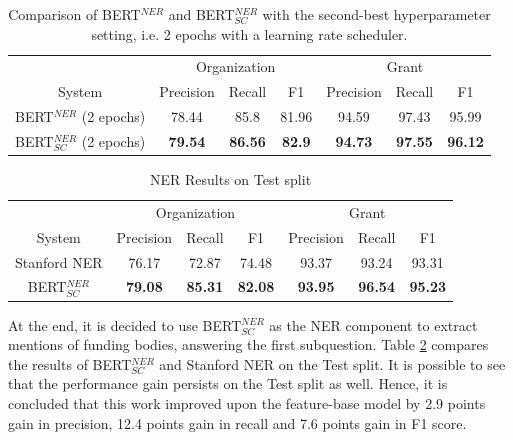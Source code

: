 \documentclass{report}
\theoremstyle{definition}
\theoremstyle{remark}
\begin{document}
\begin{table}
    \centering
    \begin{tabular}{c| c c c| c c c}
    &\multicolumn{3}{c|}{Organization}&\multicolumn{3}{c}{Grant} \\
    System&Precision&Recall&F1&Precision&Recall&F1\\
    \hline
    BERT$^{NER}$ (2 epochs) &  78.44&85.8&81.96&94.59&97.43&95.99
 \\[0.7ex]
    BERT$^{NER}_{SC}$ (2 epochs) &  \textbf{79.54}&\textbf{86.56}&\textbf{82.9}&\textbf{94.73}&\textbf{97.55}&\textbf{96.12}
  \\[0.7ex]
    \end{tabular}
    \caption{Comparison of BERT$^{NER}$ and BERT$^{NER}_{SC}$ with the second-best hyperparameter setting, i.e. 2 epochs with a learning rate scheduler.}
    \label{tab:bertsccompareother}
\end{table}

\begin{table}
    \centering
    \begin{tabular}{c| c c c| c c c}
    &\multicolumn{3}{c|}{Organization}&\multicolumn{3}{c}{Grant} \\
    System&Precision&Recall&F1&Precision&Recall&F1\\
    \hline
    Stanford NER &  76.17 & 72.87  & 74.48 & 93.37   & 93.24  & 93.31
 \\[0.7ex]
    BERT$^{NER}_{SC}$ &  \textbf{79.08} & \textbf{85.31} & \textbf{82.08}& \textbf{93.95}&   \textbf{96.54}&   \textbf{95.23}
  \\[0.7ex]
    \end{tabular}
    \caption{NER Results on Test split}
    \label{tab:all_ner_results_test}
\end{table}

At the end, it is decided to use BERT$^{NER}_{SC}$ as the NER component to extract mentions of funding bodies, answering the first subquestion. Table \ref{tab:all_ner_results_test} compares the results of BERT$^{NER}_{SC}$ and Stanford NER on the Test split. It is possible to see that the performance gain persists on the Test split as well. Hence, it is concluded that this work improved upon the feature-base model by 2.9 points gain in precision, 12.4 points gain in recall and 7.6 points gain in F1 score.
\end{document}
